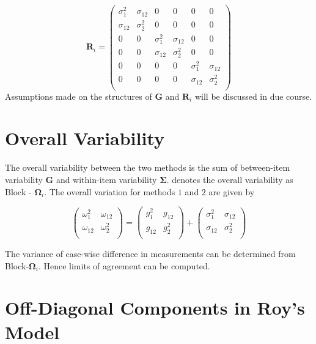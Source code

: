 \documentclass[12pt, a4paper]{report}
\theoremstyle{plain}
\theoremstyle{definition}
\theoremstyle{remark}
\begin{document}
\[
\boldsymbol{R}_i = \left(
\begin{array}{cccccc}
\sigma^2_{1} & \sigma_{12} & 0 & 0 & 0 & 0 \\
\sigma_{12} & \sigma^2_{2} & 0 & 0 & 0 & 0 \\
0 & 0 & \sigma^2_{1} & \sigma_{12} & 0 & 0 \\
0 & 0 & \sigma_{12} & \sigma^2_{2} & 0 & 0 \\
0 & 0 & 0 & 0 & \sigma^2_{1} & \sigma_{12} \\
0 & 0 & 0 & 0 & \sigma_{12} & \sigma^2_{2} \\
\end{array} \right)
\]
Assumptions made on the structures of $\boldsymbol{G}$ and $\boldsymbol{R}_i$ will be discussed in due course.


\section{Overall Variability}
The overall variability between the two methods is the sum of between-item variability
$\boldsymbol{G}$ and within-item variability $\boldsymbol{\Sigma}$. \citet{ARoy2009} denotes the overall variability	as ${\mbox{Block - }\boldsymbol \Omega_{i}}$. The overall variation for methods $1$ and $2$ are given by

\begin{center}
	\[\left(\begin{array}{cc}
	\omega^2_1  & \omega_{12} \\
	\omega_{12} & \omega^2_2 \\
	\end{array}  \right)
	=  \left(
	\begin{array}{cc}
	g^2_1  & g_{12} \\
	g_{12} & g^2_2 \\
	\end{array} \right)+
	\left(
	\begin{array}{cc}
	\sigma^2_1  & \sigma_{12} \\
	\sigma_{12} & \sigma^2_2 \\
	\end{array}\right)
	\]
\end{center}

The variance of case-wise difference in measurements can be determined from Block-$\boldsymbol{\Omega}_{i}$. Hence limits of agreement can be computed.


\section{Off-Diagonal Components in Roy's Model}
\end{document}

